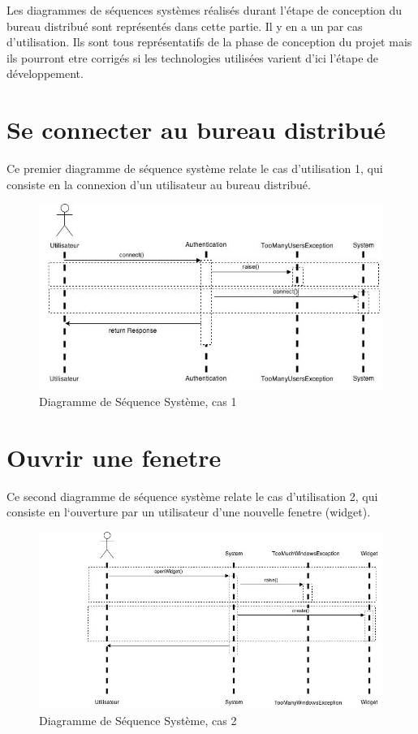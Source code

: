 Les diagrammes de séquences systèmes réalisés durant l'étape
de conception du bureau distribué sont représentés dans cette 
partie. Il y en a un par cas d'utilisation. 
Ils sont tous représentatifs de la phase de conception du projet
mais ils pourront etre corrigés si les technologies utilisées
varient d'ici l'étape de développement.

\section{Se connecter au bureau distribué}

Ce premier diagramme de séquence système relate le cas d'utilisation
1, qui consiste en la connexion d'un utilisateur au bureau distribué.

\begin{figure}[h!]
	\centering
	\includegraphics[scale=0.4]{diagrammes/DSS1.jpg}
	\caption{Diagramme de Séquence Système, cas 1}
\end{figure}

\section{Ouvrir une fenetre}

Ce second diagramme de séquence système relate le cas d'utilisation
2, qui consiste en l`ouverture par un utilisateur d'une nouvelle 
fenetre (widget).

\begin{figure}[h!]
	\centering
	\includegraphics[scale=0.4]{diagrammes/DSS2.jpg}
	\caption{Diagramme de Séquence Système, cas 2}
\end{figure}

